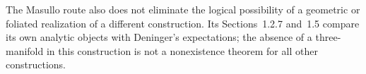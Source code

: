 The Masullo route also does not eliminate the logical possibility of a
geometric or foliated realization of a different construction.  Its
Sections~1.2.7 and~1.5 compare its own analytic objects with Deninger's
expectations; the absence of a three-manifold in this construction is
not a nonexistence theorem for all other constructions.
